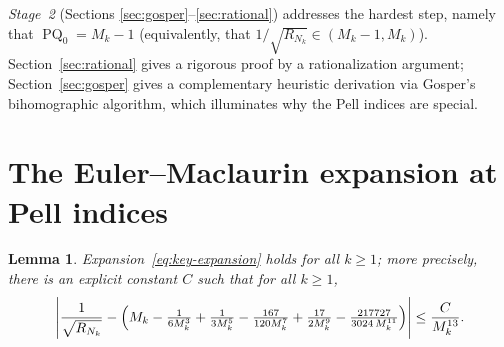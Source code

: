 \documentclass[10pt,a4paper]{amsart}
\newtheorem{lemma}[theorem]{Lemma}
\DeclareMathOperator{\PQ}{PQ}
\begin{document}
\textit{Stage~2} (Sections \ref{sec:gosper}--\ref{sec:rational})
addresses the hardest step, namely that
$\PQ_0 = M_k - 1$ (equivalently, that $1/\sqrt{R_{N_k}} \in (M_k-1, M_k)$).
Section~\ref{sec:rational} gives a rigorous proof by a rationalization
argument; Section~\ref{sec:gosper} gives a complementary heuristic
derivation via Gosper's bihomographic algorithm, which illuminates why
the Pell indices are special.

\section{The Euler--Maclaurin expansion at Pell indices}
\label{sec:em}

\begin{lemma}\label{lem:key}
  Expansion~\eqref{eq:key-expansion} holds for all $k \geq 1$; more
  precisely, there is an explicit constant $C$ such that for all
  $k \geq 1$,
  \[
    \left|\frac{1}{\sqrt{R_{N_k}}} -
      \Bigl(M_k - \tfrac{1}{6M_k^3} + \tfrac{1}{3M_k^5}
      - \tfrac{167}{120M_k^7} + \tfrac{17}{2M_k^9}
      - \tfrac{217727}{3024\,M_k^{11}}\Bigr)\right|
    \le \frac{C}{M_k^{13}}.
  \]
\end{lemma}
\end{document}
